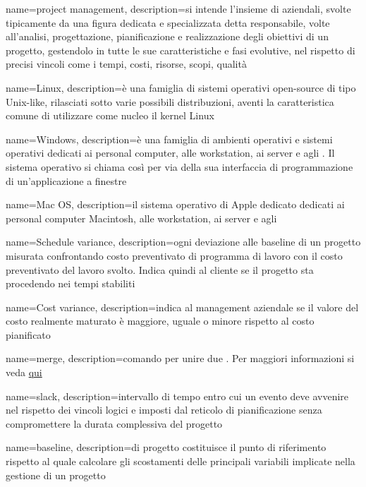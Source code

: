  {
	name=project management,
	description={si intende l'insieme di  aziendali, svolte tipicamente da una figura dedicata e specializzata detta responsabile, volte all'analisi, progettazione, pianificazione e realizzazione degli obiettivi di un progetto, gestendolo in tutte le sue caratteristiche e fasi evolutive, nel rispetto di precisi vincoli come i tempi, costi, risorse, scopi, qualità}
}

 {
	name=Linux,
	description={è una famiglia di sistemi operativi open-source di tipo Unix-like, rilasciati sotto varie possibili distribuzioni, aventi la caratteristica comune di utilizzare come nucleo il kernel Linux}
}

 {
	name=Windows,
	description={è una famiglia di ambienti operativi e sistemi operativi dedicati ai personal computer, alle workstation, ai server e agli . Il sistema operativo si chiama così per via della sua interfaccia di programmazione di un'applicazione a finestre}
}

 {
	name=Mac OS,
	description={il sistema operativo di Apple dedicato dedicati ai personal computer Macintosh, alle workstation, ai server e agli   }
}


 {
	name=Schedule variance,
	description={ogni deviazione alle baseline di un progetto misurata confrontando costo preventivato di programma di lavoro con il costo preventivato del lavoro svolto. Indica quindi al cliente se il progetto sta procedendo nei tempi stabiliti}
}

 {
	name=Cost variance,
	description={indica al management aziendale se il valore del costo realmente maturato è maggiore, uguale o minore rispetto al costo pianificato}
}


 {
	name=merge,
	description={comando  per unire due . Per maggiori informazioni si veda \href{https://git-scm.com/docs/}{qui}}
}

 {
	name=slack,
	description={intervallo di tempo entro cui un evento deve avvenire nel rispetto dei vincoli logici e imposti dal reticolo di pianificazione senza compromettere la durata complessiva del progetto}
}

 {
	name=baseline,
	description={di progetto costituisce il punto di riferimento rispetto al quale calcolare gli scostamenti delle principali variabili implicate nella gestione di un progetto}
}


